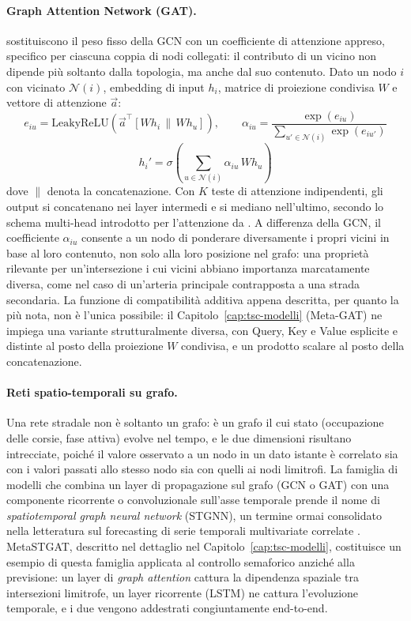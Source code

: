 \paragraph{Graph Attention Network (GAT).} \citet{velickovic2018gat} sostituiscono
il peso fisso della GCN con un coefficiente di attenzione appreso,
specifico per ciascuna coppia di nodi collegati: il contributo di un
vicino non dipende più soltanto dalla topologia, ma anche dal suo
contenuto. Dato un nodo $i$ con vicinato $\mathcal{N}(i)$, embedding di
input $h_i$, matrice di proiezione condivisa $W$ e vettore di attenzione
$\vec a$:
\begin{equation}
  e_{iu} = \mathrm{LeakyReLU}\!\left(\vec a^\top [W h_i \,\|\, W h_u]\right),
  \qquad
  \alpha_{iu} = \frac{\exp(e_{iu})}{\sum_{u' \in \mathcal{N}(i)} \exp(e_{iu'})}
  \label{eq:gat-attention}
\end{equation}
\begin{equation}
  h_i' = \sigma\!\left(\sum_{u \in \mathcal{N}(i)} \alpha_{iu}\, W h_u\right)
  \label{eq:gat-aggregate}
\end{equation}
dove $\|$ denota la concatenazione. Con $K$ teste di attenzione
indipendenti, gli output si concatenano nei layer intermedi e si mediano
nell'ultimo, secondo lo schema multi-head introdotto per l'attenzione da
\citet{vaswani2017attention}. A differenza della GCN, il coefficiente
$\alpha_{iu}$ consente a un nodo di ponderare diversamente i propri vicini
in base al loro contenuto, non solo alla loro posizione nel grafo: una
proprietà rilevante per un'intersezione i cui vicini abbiano importanza
marcatamente diversa, come nel caso di un'arteria principale contrapposta
a una strada secondaria. La funzione di compatibilità additiva appena
descritta, per quanto la più nota, non è l'unica possibile: il
Capitolo~\ref{cap:tsc-modelli} (Meta-GAT) ne impiega una variante
strutturalmente diversa, con Query, Key e Value esplicite e distinte al
posto della proiezione $W$ condivisa, e un prodotto scalare al posto della
concatenazione.

\paragraph{Reti spatio-temporali su grafo.} Una rete stradale non è
soltanto un grafo: è un grafo il cui stato (occupazione delle corsie, fase
attiva) evolve nel tempo, e le due dimensioni risultano intrecciate, poiché
il valore osservato a un nodo in un dato istante è correlato sia con i
valori passati allo stesso nodo sia con quelli ai nodi limitrofi. La
famiglia di modelli che combina un layer di propagazione sul grafo (GCN o
GAT) con una componente ricorrente o convoluzionale sull'asse temporale
prende il nome di \emph{spatiotemporal graph neural network} (STGNN), un
termine ormai consolidato nella letteratura sul forecasting di serie
temporali multivariate correlate \citep{cini2025graphdl}. MetaSTGAT,
descritto nel dettaglio nel Capitolo~\ref{cap:tsc-modelli}, costituisce un esempio 
di questa famiglia applicata al controllo semaforico anziché
alla previsione: un layer di \emph{graph attention} cattura la dipendenza
spaziale tra intersezioni limitrofe, un layer ricorrente (LSTM) ne
cattura l'evoluzione temporale, e i due vengono addestrati congiuntamente
end-to-end.

